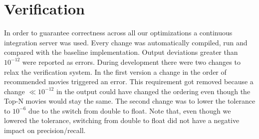 \section{Verification}\label{sec:verification}
In order to guarantee correctness across all our optimizations a continuous integration server was used. Every change was automatically compiled, run and compared with the baseline implementation. Output deviations greater than $10^{-12}$ were reported as errors. During development there were two changes to relax the verification system. In the first version a change in the order of recommended movies triggered an error. This requirement got removed because a change $ \ll 10^{-12}$ in the output could have changed the ordering even though the Top-N movies would stay the same. The second change was to lower the tolerance to $10^{-6}$ due to the switch from double to float. Note that, even though we lowered the tolerance, switching from double to float did not have a negative impact on precision/recall.

